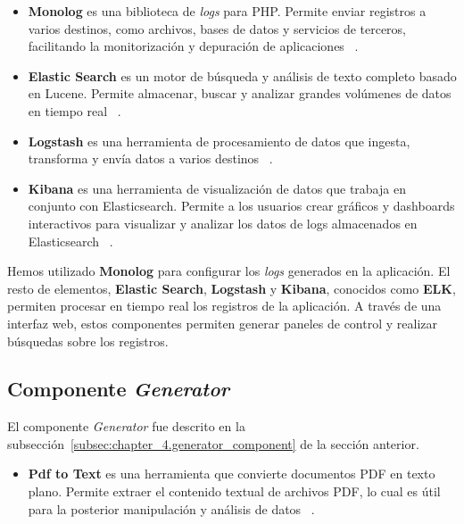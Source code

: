 \begin{itemize}
    \item \textbf{Monolog} es una biblioteca de \textit{logs} para PHP. Permite enviar registros a varios destinos, como
    archivos, bases de datos y servicios de terceros, facilitando la monitorización y depuración de aplicaciones
    ~\cite{https://github.com/Seldaek/monolog}.
    \item \textbf{Elastic Search} es un motor de búsqueda y análisis de texto completo basado en Lucene.
    Permite almacenar, buscar y analizar grandes volúmenes de datos en tiempo real
    ~\cite{https://www.elastic.co/guide/en/elasticsearch/reference/current/index.html}.
    \item \textbf{Logstash} es una herramienta de procesamiento de datos que ingesta, transforma y envía datos a varios
    destinos ~\cite{https://www.elastic.co/guide/en/logstash/current/index.html}.
    \item \textbf{Kibana} es una herramienta de visualización de datos que trabaja en conjunto con Elasticsearch.
    Permite a los usuarios crear gráficos y dashboards interactivos para visualizar y analizar los datos de logs
    almacenados en Elasticsearch ~\cite{https://www.elastic.co/guide/en/kibana/current/index.html}.
\end{itemize}

Hemos utilizado \textbf{Monolog} para configurar los \textit{logs} generados en la aplicación.
El resto de elementos, \textbf{Elastic Search}, \textbf{Logstash} y \textbf{Kibana}, conocidos como \textbf{ELK},
permiten procesar en tiempo real los registros de la aplicación.
A través de una interfaz web, estos componentes permiten generar paneles de control y realizar búsquedas sobre los
registros.

\subsection*{Componente \textit{Generator}}

El componente \textit{Generator} fue descrito en la subsección~\ref{subsec:chapter_4.generator_component}
de la sección anterior.

\begin{itemize}
    \item \textbf{Pdf to Text} es una herramienta que convierte documentos PDF en texto plano.
    Permite extraer el contenido textual de archivos PDF, lo cual es útil para la posterior manipulación y análisis de
    datos ~\cite{https://www.xpdfreader.com/pdftotext-man.html}.
\end{itemize}

